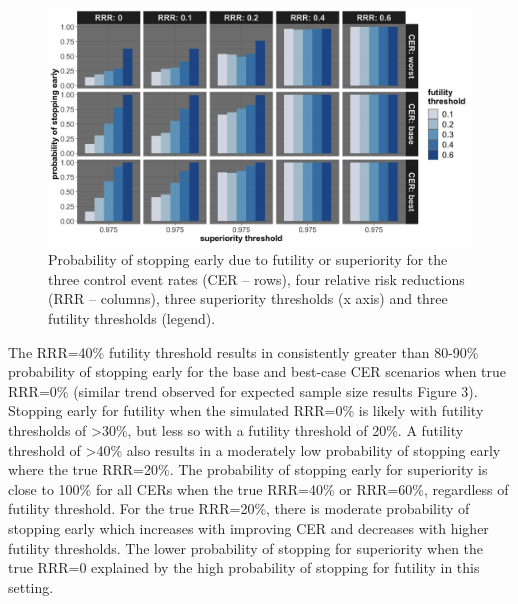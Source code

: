 \documentclass[]{article}
\begin{document}
\begin{figure}
  \caption{Probability of stopping early due to futility or superiority for the three control event rates (CER – rows),
  four relative risk reductions (RRR – columns), three superiority thresholds (x axis) and three futility thresholds
  (legend).}
  \includegraphics{../p1_plots/batch_size_nb_1000/prob_stop_early_p1.png}
\end{figure}

The RRR=40\% futility threshold results in consistently greater than
80-90\% probability of stopping early for the base and best-case CER
scenarios when true RRR=0\% (similar trend observed for expected sample
size results Figure 3). Stopping early for futility when the simulated
RRR=0\% is likely with futility thresholds of \textgreater{}30\%, but
less so with a futility threshold of 20\%. A futility threshold of
\textgreater{}40\% also results in a moderately low probability of
stopping early where the true RRR=20\%. The probability of stopping
early for superiority is close to 100\% for all CERs when the true
RRR=40\% or RRR=60\%, regardless of futility threshold. For the true
RRR=20\%, there is moderate probability of stopping early which
increases with improving CER and decreases with higher futility
thresholds. The lower probability of stopping for superiority when the
true RRR=0 explained by the high probability of stopping for futility in
this setting.
\end{document}
